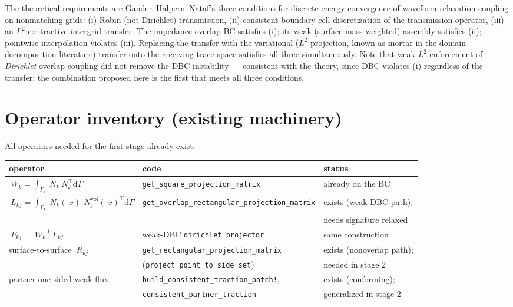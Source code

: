 \documentclass[11pt]{article}
\newcommand{\dd}{\mathrm{d}}
\begin{document}
The theoretical requirements are Gander--Halpern--Nataf's three
conditions for discrete energy convergence of waveform-relaxation
coupling on nonmatching grids: (i) Robin (not Dirichlet) transmission,
(ii) consistent boundary-cell discretization of the transmission
operator, (iii) an $L^2$-contractive intergrid transfer.  The
impedance-overlap BC satisfies (i); its weak (surface-mass-weighted)
assembly satisfies (ii); pointwise interpolation violates (iii).
Replacing the transfer with the variational ($L^2$-projection, known as
mortar in the domain-decomposition literature) transfer onto the
receiving trace space satisfies all three simultaneously.  Note that
weak-$L^2$ enforcement of \emph{Dirichlet} overlap coupling did not
remove the DBC instability --- consistent with the theory, since DBC
violates (i) regardless of the transfer; the combination proposed here
is the first that meets all three conditions.

\section{Operator inventory (existing machinery)}

All operators needed for the first stage already exist:

\begin{center}
\small
\begin{tabular}{lll}
\toprule
operator & code & status \\
\midrule
$~W_k = \int_{\Gamma_k} ~N_k ~N_k^\top \dd\Gamma$ &
  \texttt{get\_square\_projection\_matrix} &
  already on the BC \\[0.3em]
$~L_{kj} = \int_{\Gamma_k} ~N_k(~x)\, ~N_j^{\mathrm{vol}}(~x)^\top \dd\Gamma$ &
  \texttt{get\_overlap\_rectangular\_projection\_matrix} &
  exists (weak-DBC path); \\
  & & needs signature relaxed \\[0.3em]
$~P_{kj} = ~W_k^{-1} ~L_{kj}$ &
  weak-DBC \texttt{dirichlet\_projector} &
  same construction \\[0.3em]
surface-to-surface $~R_{kj}$ &
  \texttt{get\_rectangular\_projection\_matrix} &
  exists (nonoverlap path); \\
  & (\texttt{project\_point\_to\_side\_set}) & needed in stage 2 \\[0.3em]
partner one-sided weak flux &
  \texttt{build\_consistent\_traction\_patch!}, &
  exists (conforming); \\
  & \texttt{consistent\_partner\_traction} & generalized in stage 2 \\
\bottomrule
\end{tabular}
\end{center}
\end{document}
